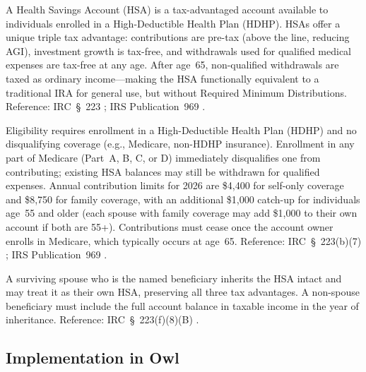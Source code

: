 \documentclass[fleqn,12pt]{report}
\begin{document}
A Health Savings Account (HSA) is a tax-advantaged account available to
individuals enrolled in a High-Deductible Health Plan (HDHP).
HSAs offer a unique triple tax advantage: contributions are pre-tax (above the
line, reducing AGI), investment growth is tax-free, and withdrawals used for
qualified medical expenses are tax-free at any age.
After age~65, non-qualified withdrawals are taxed as ordinary income---making
the HSA functionally equivalent to a traditional IRA for general use, but
without Required Minimum Distributions.
Reference: IRC~§~223 \cite{irc223}; IRS Publication~969 \cite{irs969}.

Eligibility requires enrollment in a High-Deductible Health Plan (HDHP)
and no disqualifying coverage (e.g., Medicare, non-HDHP insurance).
Enrollment in any part of Medicare (Part~A, B, C, or D) immediately
disqualifies one from contributing; existing HSA balances may still be
withdrawn for qualified expenses.
Annual contribution limits for 2026 are \$4,400 for self-only coverage and
\$8,750 for family coverage, with an additional \$1,000 catch-up for
individuals age~55 and older (each spouse with family coverage may add
\$1,000 to their own account if both are 55+).
Contributions must cease once the account owner enrolls in Medicare, which
typically occurs at age~65.
Reference: IRC~§~223(b)(7) \cite{irc223}; IRS Publication~969 \cite{irs969}.

A surviving spouse who is the named beneficiary inherits the HSA intact and
may treat it as their own HSA, preserving all three tax advantages.
A non-spouse beneficiary must include the full account balance in taxable
income in the year of inheritance.
Reference: IRC~§~223(f)(8)(B) \cite{irc223}.

\subsection*{Implementation in Owl}
\end{document}
